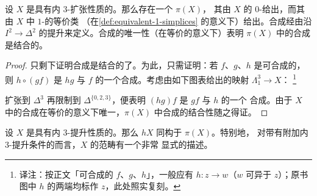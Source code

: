 \begin{lemma}\label{lem:pi-x-category}
设 $X$ 是具有内 $3$-\trHorn{}扩张性质的\trComposer{}。那么存在一个\trCategory{} $\pi(X)$，
其\trObject{}由 $X$ 的 $0$-\trSimplex{}给出，而其\trMorphism{}由 $X$ 中 $1$-\trSimplex{}的等价类
（在\cref{def:equivalent-1-simplices} 的意义下）给出。合成经由沿 $I^2 \to \Delta^2$
的提升来定义。合成的唯一性（在等价的意义下）表明 $\pi(X)$ 中的合成是结合的。
\end{lemma}

\begin{proof}
只剩下证明合成是结合的了。为此，只需证明：若 $f$、$g$、$h$ 是可合成的\trMorphism{}，
则 $h \circ (gf)$ 是 $hg$ 与 $f$ 的一个合成。考虑由如下图表给出的映射
$\Lambda^3_1 \to X$：%
\footnote{译注：按正文「可合成的\trMorphism{} $f$、$g$、$h$」，一般应有
$h\colon z \to w$（$w$ 可异于 $z$）；原书图中 $h$ 的两端均标作 $z$，此处照实复刻。}
\begin{center}
\end{center}
扩张到 $\Delta^3$ 再限制到 $\Delta^{\{0,2,3\}}$，便表明 $(hg)f$ 是 $gf$ 与 $h$ 的一个
合成。由于 $X$ 中的合成在等价的意义下唯一，$\pi(X)$ 中合成的结合性随之得证。
\end{proof}

\begin{corollary}\label{cor:hx-pi-x}
设 $X$ 是具有内 $3$-\trHorn{}提升性质的\trComposer{}。那么 $hX$ 同构于 $\pi(X)$。特别地，
对带有附加内 $3$-\trHorn{}提升条件的\trComposer{}而言，$X$ 的\trHomotopy{}范畴有一个非常
显式的描述。
\end{corollary}

